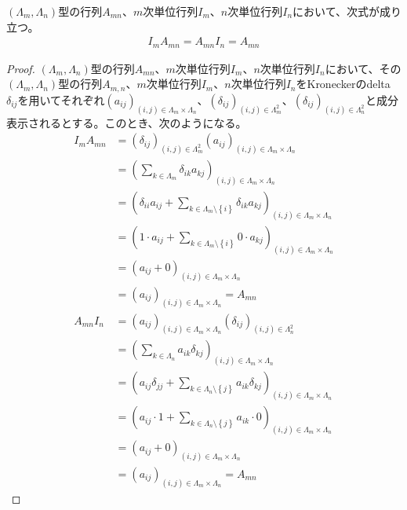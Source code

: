 \documentclass[dvipdfmx]{jsarticle}
\begin{document}
\begin{thm}\label{2.1.3.4}
$\left( \varLambda_{m},\varLambda_{n} \right)$型の行列$A_{mn}$、$m$次単位行列$I_{m}$、$n$次単位行列$I_{n}$において、次式が成り立つ。
\begin{align*}
I_{m}A_{mn} = A_{mn}I_{n} = A_{mn}
\end{align*}
\end{thm}
\begin{proof}
$\left( \varLambda_{m},\varLambda_{n} \right)$型の行列$A_{mn}$、$m$次単位行列$I_{m}$、$n$次単位行列$I_{n}$において、その$\left( \varLambda_{m},\varLambda_{n} \right)$型の行列$A_{m,n}$、$m$次単位行列$I_{m}$、$n$次単位行列$I_{n}$をKroneckerのdelta$\delta_{ij}$を用いてそれぞれ$\left( a_{ij} \right)_{(i,j) \in \varLambda_{m} \times \varLambda_{n}}$、$\left( \delta_{ij} \right)_{(i,j) \in \varLambda_{m}^{2}}$、$\left( \delta_{ij} \right)_{(i,j) \in \varLambda_{n}^{2}}$と成分表示されるとする。このとき、次のようになる。
\begin{align*}
I_{m}A_{mn} &= \left( \delta_{ij} \right)_{(i,j) \in \varLambda_{m}^{2}}\left( a_{ij} \right)_{(i,j) \in \varLambda_{m} \times \varLambda_{n}}\\
&= \left( \sum_{k \in \varLambda_{m}} {\delta_{ik}a_{kj}} \right)_{(i,j) \in \varLambda_{m} \times \varLambda_{n}}\\
&= \left( \delta_{ii}a_{ij} + \sum_{k \in \varLambda_{m} \setminus \left\{ i \right\}} {\delta_{ik}a_{kj}} \right)_{(i,j) \in \varLambda_{m} \times \varLambda_{n}}\\
&= \left( 1 \cdot a_{ij} + \sum_{k \in \varLambda_{m} \setminus \left\{ i \right\}} {0 \cdot a_{kj}} \right)_{(i,j) \in \varLambda_{m} \times \varLambda_{n}}\\
&= \left( a_{ij} + 0 \right)_{(i,j) \in \varLambda_{m} \times \varLambda_{n}}\\
&= \left( a_{ij} \right)_{(i,j) \in \varLambda_{m} \times \varLambda_{n}} = A_{mn}\\
A_{mn}I_{n} &= \left( a_{ij} \right)_{(i,j) \in \varLambda_{m} \times \varLambda_{n}}\left( \delta_{ij} \right)_{(i,j) \in \varLambda_{n}^{2}}\\
&= \left( \sum_{k \in \varLambda_{n}} {a_{ik}\delta_{kj}} \right)_{(i,j) \in \varLambda_{m} \times \varLambda_{n}}\\
&= \left( a_{ij}\delta_{jj} + \sum_{k \in \varLambda_{n} \setminus \left\{ j \right\}} {a_{ik}\delta_{kj}} \right)_{(i,j) \in \varLambda_{m} \times \varLambda_{n}}\\
&= \left( a_{ij} \cdot 1 + \sum_{k \in \varLambda_{n} \setminus \left\{ j \right\}} {a_{ik} \cdot 0} \right)_{(i,j) \in \varLambda_{m} \times \varLambda_{n}}\\
&= \left( a_{ij} + 0 \right)_{(i,j) \in \varLambda_{m} \times \varLambda_{n}}\\
&= \left( a_{ij} \right)_{(i,j) \in \varLambda_{m} \times \varLambda_{n}} = A_{mn}
\end{align*}
\end{proof}
\end{document}
